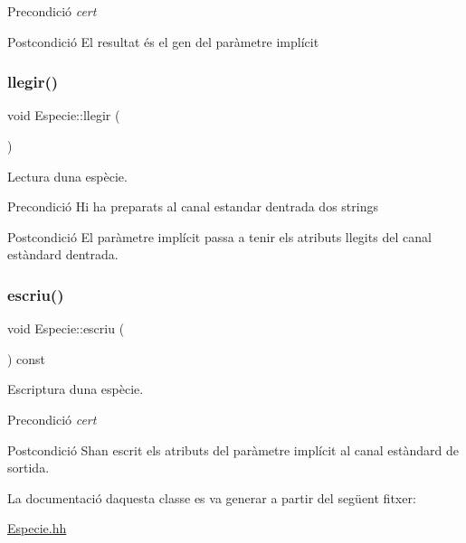 \begin{DoxyPrecond}{Precondició}
{\itshape cert} 
\end{DoxyPrecond}
\begin{DoxyPostcond}{Postcondició}
El resultat és el gen del paràmetre implícit 
\end{DoxyPostcond}
\mbox{\label{class_especie_a7384add391d2684c4fb6bdf8a535fba3}} 
\subsubsection{\texorpdfstring{llegir()}{llegir()}}
{\footnotesize\ttfamily void Especie\+::llegir (\begin{DoxyParamCaption}{ }\end{DoxyParamCaption})}



Lectura d\textquotesingle{}una espècie. 

\begin{DoxyPrecond}{Precondició}
Hi ha preparats al canal estandar d\textquotesingle{}entrada dos strings 
\end{DoxyPrecond}
\begin{DoxyPostcond}{Postcondició}
El paràmetre implícit passa a tenir els atributs llegits del canal estàndard d\textquotesingle{}entrada. 
\end{DoxyPostcond}
\mbox{\label{class_especie_ae0db47c73d1ea93aebdae93b77ec468e}} 
\subsubsection{\texorpdfstring{escriu()}{escriu()}}
{\footnotesize\ttfamily void Especie\+::escriu (\begin{DoxyParamCaption}{ }\end{DoxyParamCaption}) const}



Escriptura d\textquotesingle{}una espècie. 

\begin{DoxyPrecond}{Precondició}
{\itshape cert} 
\end{DoxyPrecond}
\begin{DoxyPostcond}{Postcondició}
S\textquotesingle{}han escrit els atributs del paràmetre implícit al canal estàndard de sortida. 
\end{DoxyPostcond}


La documentació d\textquotesingle{}aquesta classe es va generar a partir del següent fitxer\+:\begin{DoxyCompactItemize}
\item 
\hyperlink{_especie_8hh}{Especie.\+hh}\end{DoxyCompactItemize}
